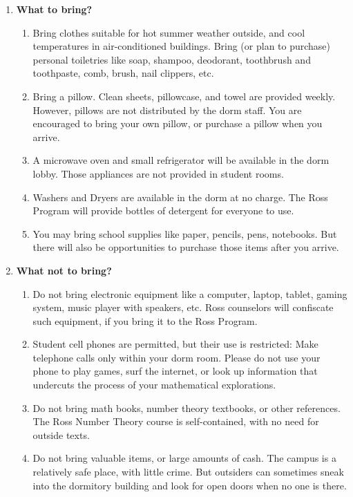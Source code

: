 \documentclass[11pt]{ross}
\begin{document}
\begin{enumerate}[label=(\arabic*),itemsep=2em,topsep=-1em]
\item \textbf{What to bring?}
 \begin{enumerate}[label=(\alph*),itemsep=0.5em,topsep=0em]
 \item Bring clothes suitable for hot summer weather outside, and cool
   temperatures in air-conditioned buildings.  Bring (or plan to
   purchase) personal toiletries like soap, shampoo, deodorant,
   toothbrush and toothpaste, comb, brush, nail clippers, etc.
 \item Bring a pillow.  Clean sheets, pillowcase, and towel are
   provided weekly.  However, pillows are not distributed by the dorm
   staff.  You are encouraged to bring your own pillow, or purchase a
   pillow when you arrive.
 \item A microwave oven and small refrigerator will be available in
   the dorm lobby.  Those appliances are not provided in student
   rooms.
 \item Washers and Dryers are available in the dorm at no charge.  The
   Ross Program will provide bottles of detergent for everyone to use.
 \item You may bring school supplies like paper, pencils, pens,
   notebooks.  But there will also be opportunities to purchase those
   items after you arrive.
\end{enumerate}
\item \textbf{What not to bring?}
  \begin{enumerate}[label=(\alph*),itemsep=0.5em,topsep=0em]
  \item Do not bring electronic equipment like a computer, laptop,
    tablet, gaming system, music player with speakers, etc.  Ross
    counselors will confiscate such equipment, if you bring it to the
    Ross Program.
  \item Student cell phones are permitted, but their use is
    restricted: Make telephone calls only within your dorm room.
    Please do not use your phone to play games, surf the internet, or
    look up information that undercuts the process of your
    mathematical explorations.
  \item Do not bring math books, number theory textbooks, or other references.  
    The Ross Number Theory course is self-contained, with no need for 
    outside texts.
  \item Do not bring valuable items, or large amounts of cash.  The
    campus is a relatively safe place, with little crime.  But
    outsiders can sometimes sneak into the dormitory building and look
    for open doors when no one is there.

\end{enumerate}
\end{enumerate}
\end{document}
